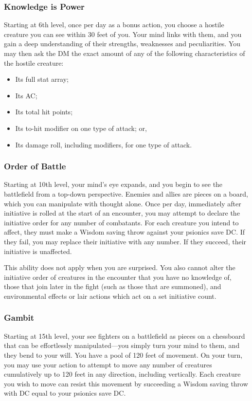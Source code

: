\subsubsection{Knowledge is Power}
Starting at 6th level,
once per day as a bonus action,
you choose a hostile creature you can see within
30 feet of you.
Your mind links with them,
and you gain a deep understanding of their
strengths, weaknesses and peculiarities.
You may then ask the DM the exact amount of any of the following
characteristics of the hostile creature:
\begin{itemize}
    \item Its full stat array;
    \item Its AC;
    \item Its total hit points;
    \item Its to-hit modifier on one type of attack; or,
    \item Its damage roll, including modifiers, for one type
            of attack.
\end{itemize}

\subsubsection{Order of Battle}
Starting at 10th level,
your mind's eye expands,
and you begin to see the battlefield from a top-down perspective.
Enemies and allies are pieces on a board, which you can manipulate
with thought alone.
Once per day,
immediately after initiative is rolled at the start of an encounter,
you may attempt to declare the initiative order for
any number of combatants.
For each creature you intend to affect,
they must make a Wisdom saving throw against your psionics save DC.
If they fail, you may replace their initiative with any number.
If they succeed, their initiative is unaffected. 

This ability does not apply when you are surprised.
You also cannot alter the initiative order of creatures
in the encounter that you have no knowledge of,
those that join later in the fight (such as those
that are summoned),
and environmental effects or lair actions
which act on a set initiative count.

\subsubsection{Gambit}
Starting at 15th level,
your see fighters on a battlefield as pieces on a chessboard
that can be effortlessly manipulated---you simply turn your
mind to them, and they bend to your will.
You have a pool of 120 feet of movement.
On your turn,
you may use your action to attempt to move any number of creatures
cumulatively up to 120 feet in any direction,
including vertically.
Each creature you wish to move can resist this movement by
succeeding a Wisdom saving throw with DC equal to your
psionics save DC.


